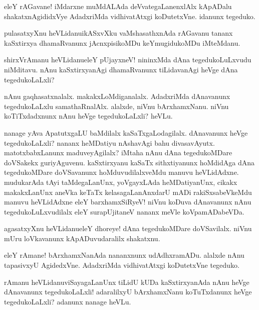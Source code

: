 \begin{mng}
eleY rAGavane! iMdarxne muMdALAda deVvategaLanenxlAlx kApADalu shakatxnAgididxVye AdadxriMda vidhivatAtxgi koDutetxVne. idanunx tegeduko.
\end{mng}

\begin{mng}
pulasatxyXnu heVLidanu\mdash ikASxvXku vaMshasathxnAda rAGavanu tananx kaSxtirxya dhamaRvanunx jAcnxpisikoMDu keYmugidukoMDu iMteMdanu.
\end{mng}

\begin{mng}
shirxVrAmanu heVLidanu\mdash eleY pUjayxneV! nininxMda dAna tegedukoLuLxvudu niMditavu. nAnu kaSxtirxyanAgi dhamaRvanunx tiLidavanAgi heVge dAna tegedukoLaLxli?
\end{mng}

\begin{mng}
nAnu gaqhasatxnalalx. makakxLoMdiganalalx. AdadxriMda dAnavanunx tegedukoLaLxlu samathaRnalAlx. alalxde, niVnu bArxhamxNanu. niVnu koTiTxdadxnunx nAnu heVge tegedukoLaLxli? heVLu.
\end{mng}

\begin{mng}
nanage yAva ApatutxgaLU baMdilalx kaSaTxgaLodagilalx. dAnavanunx heVge tegedukoLaLxli? nananx heMDatiyu nAshavAgi bahu divasavAyutx. matotxbabxLanunx maduveyAgilalx? iMtaha nAnu dAna tegedukoMDare doVSakekx guriyAguvenu. kaSxtirxyanu kaSaTx sithxtiyanunx hoMdidAga dAna tegedukoMDare doVSavanunx hoMduvudilalxveMdu manuvu heVLidAdxne. mudukarAda tAyi taMdegaLanUnx, yoVgayxLAda heMDatiyanUnx, cikakx makakxLanUnx aneVka keTaTx kelasagaLanAnxdarU mADi rakiSxsabeVkeMdu manuvu heVLidAdxne eleY barxhamxSiRyeV! niVnu koDuva dAnavanunx nAnu tegedukoLuLxvudilalx eleY surapUjitaneV nananx meVle koVpamADabeVDa.
\end{mng}

\begin{mng}
agasatxyXnu heVLidanu\mdash eleY dhoreye! dAna tegedukoMDare doVSavilalx. niVnu mUru loVkavanunx kApADuvudaralilx shakatxnu.
\end{mng}

\begin{mng}
eleY rAmane! bArxhamxNanAda nananxnunx udAdhxramADu. alalxde nAnu tapasivxyU AgidedxVne. AdadxriMda vidhivatAtxgi koDutetxVne tegeduko.
\end{mng}

\begin{mng}
rAmanu heVLidanu\mdash viSayagaLanUnx tiLidU kUDa kaSxtirxyanAda nAnu heVge dAnavanunx tegedukoLaLxli! adaralilxyU bArxhamxNanu koTuTxdanunx heVge tegedukoLaLxli? adanunx nanage heVLu.
\end{mng}

